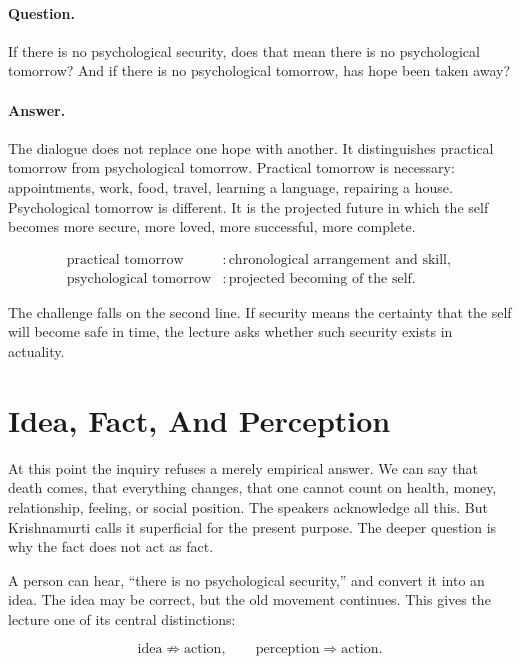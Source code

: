 \paragraph{Question.}
If there is no psychological security, does that mean there is no psychological tomorrow? And if there is no psychological tomorrow, has hope been taken away?

\paragraph{Answer.}
The dialogue does not replace one hope with another. It distinguishes practical tomorrow from psychological tomorrow. Practical tomorrow is necessary: appointments, work, food, travel, learning a language, repairing a house. Psychological tomorrow is different. It is the projected future in which the self becomes more secure, more loved, more successful, more complete.

\begin{align}
\text{practical tomorrow} &: \text{chronological arrangement and skill}, \\
\text{psychological tomorrow} &: \text{projected becoming of the self}.
\end{align}

The challenge falls on the second line. If security means the certainty that the self will become safe in time, the lecture asks whether such security exists in actuality.

\section{Idea, Fact, And Perception}

At this point the inquiry refuses a merely empirical answer. We can say that death comes, that everything changes, that one cannot count on health, money, relationship, feeling, or social position. The speakers acknowledge all this. But Krishnamurti calls it superficial for the present purpose. The deeper question is why the fact does not act as fact.

A person can hear, ``there is no psychological security,'' and convert it into an idea. The idea may be correct, but the old movement continues. This gives the lecture one of its central distinctions:

\begin{equation}
\text{idea} \not\Rightarrow \text{action},
\qquad
\text{perception} \Rightarrow \text{action}.
\end{equation}

